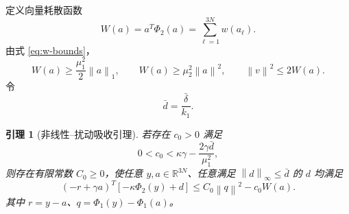 \documentclass[UTF8,a4paper,12pt]{ctexart}
\newtheorem{lemma}{引理}
\newcommand{\R}{\mathbb{R}}
\newcommand{\norm}[1]{\left\lVert #1\right\rVert}
\begin{document}
定义向量耗散函数
\begin{equation}
 W(a)=a^T\Phi_2(a)=\sum_{\ell=1}^{3N}w(a_\ell).
\label{eq:W-def}
\end{equation}
由式 \eqref{eq:w-bounds}，
\begin{equation}
 W(a)\ge\frac{\mu_1^2}{2}\norm{a}_1,\qquad
 W(a)\ge\mu_2^2\norm{a}^2,\qquad
 \norm v^2\le2W(a).
\label{eq:W-vector-bounds}
\end{equation}
令
\begin{equation}
 \bar d=\frac{\bar\delta}{k_1}.
\end{equation}

\begin{lemma}[非线性--扰动吸收引理]
若存在 $c_0>0$ 满足
\begin{equation}
 0<c_0<\kappa\gamma-\frac{2\gamma\bar d}{\mu_1^2},
\label{eq:c0-condition}
\end{equation}
则存在有限常数 $C_0\ge0$，使任意 $y,a\in\R^{3N}$、任意满足 $\norm{d}_\infty\le\bar d$ 的 $d$ 均满足
\begin{equation}
 (-r+\gamma a)^T[-\kappa\Phi_2(y)+d]
 \le C_0\norm q^2-c_0W(a).
\label{eq:C0-inequality}
\end{equation}
其中 $r=y-a$、$q=\Phi_1(y)-\Phi_1(a)$。
\end{lemma}
\end{document}
